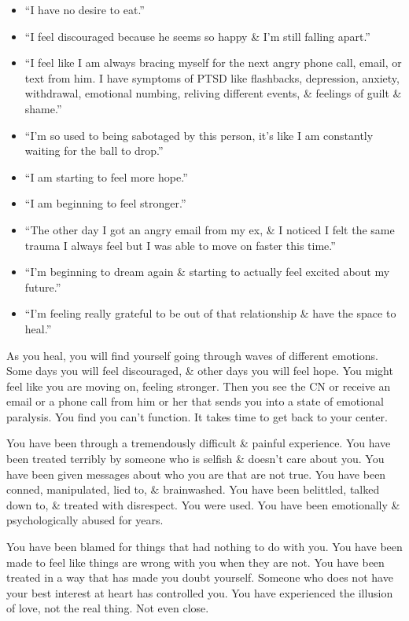 \documentclass{article}
\numberwithin{equation}{section}
\begin{document}
\begin{itemize}
	\item ``I have no desire to eat.''
	\item ``I feel discouraged because he seems so happy \& I'm still falling apart.''
	\item ``I feel like I am always bracing myself for the next angry phone call, email, or text from him. I have symptoms of PTSD like flashbacks, depression, anxiety, withdrawal, emotional numbing, reliving different events, \& feelings of guilt \& shame.''
	\item ``I'm so used to being sabotaged by this person, it's like I am constantly waiting for the ball to drop.''
	\item ``I am starting to feel more hope.''
	\item ``I am beginning to feel stronger.''
	\item ``The other day I got an angry email from my ex, \& I noticed I felt the same trauma I always feel but I was able to move on faster this time.''
	\item ``I'm beginning to dream again \& starting to actually feel excited about my future.''
	\item ``I'm feeling really grateful to be out of that relationship \& have the space to heal.''
\end{itemize}
As you heal, you will find yourself going through waves of different emotions. Some days you will feel discouraged, \& other days you will feel hope. You might feel like you are moving on, feeling stronger. Then you see the CN or receive an email or a phone call from him or her that sends you into a state of emotional paralysis. You find you can't function. It takes time to get back to your center.

You have been through a tremendously difficult \& painful experience. You have been treated terribly by someone who is selfish \& doesn't care about you. You have been given messages about who you are that are not true. You have been conned, manipulated, lied to, \& brainwashed. You have been belittled, talked down to, \& treated with disrespect. You were used. You have been emotionally \& psychologically abused for years.

You have been blamed for things that had nothing to do with you. You have been made to feel like things are wrong with you when they are not. You have been treated in a way that has made you doubt yourself. Someone who does not have your best interest at heart has controlled you. You have experienced the illusion of love, not the real thing. Not even close.
\end{document}
